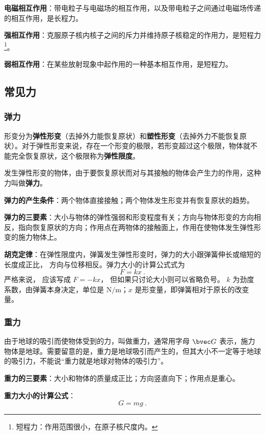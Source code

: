 \textbf{电磁相互作用}：带电粒子与电磁场的相互作用，以及带电粒子之间通过电磁场传递的相互作用，是长程力。

\textbf{强相互作用}：克服原子核内核子之间的斥力并维持原子核稳定的作用力，是短程力\footnote{短程力：作用范围很小，在原子核尺度内。}。

\textbf{弱相互作用}：在某些放射现象中起作用的一种基本相互作用，是短程力。

\subsection{常见力}

\subsubsection{弹力}
形变分为\textbf{弹性形变}（去掉外力能恢复原状）和\textbf{塑性形变}（去掉外力不能恢复原状）。对于弹性形变来说，存在一个形变的极限，若形变超过这个极限，物体就不能完全恢复原状，这个极限称为\textbf{弹性限度}。

发生弹性形变的物体，由于要恢复原状而对与其接触的物体会产生力的作用，这种力叫做\textbf{弹力}。

\textbf{弹力的产生条件}：两个物体直接接触；两个物体发生形变并有恢复原状的趋势。

\textbf{弹力的三要素}：大小与物体的弹性强弱和形变程度有关；方向与物体形变的方向相反，指向恢复原状的方向；作用点在两物体的接触面上，作用在使物体发生弹性形变的施力物体上。

\textbf{胡克定律}：在弹性限度内，弹簧发生弹性形变时，弹力的大小跟弹簧伸长或缩短的长度成正比， 方向与位移相反。弹力大小的计算公式式为
\begin{equation}
F=kx~.
\end{equation}
严格来说， 应该写成 $F=-kx$， 但如果只讨论大小则可以省略负号。 $k$ 为劲度系数，由弹簧本身决定，单位是 $\mathrm{N/m}$；$x$ 是形变量，即弹簧相对于原长的改变量。

\subsubsection{重力}
由于地球的吸引而使物体受到的力，叫做重力，通常用字母 $\bvec G$ 表示，施力物体是地球。需要留意的是，重力是地球吸引而产生的，但其大小不一定等于地球的吸引力，不能说“重力就是地球对物体的吸引力”。

\textbf{重力的三要素}：大小和物体的质量成正比；方向竖直向下；作用点是重心。

\textbf{重力大小的计算公式}：
\begin{equation}
G=mg~.
\end{equation}

